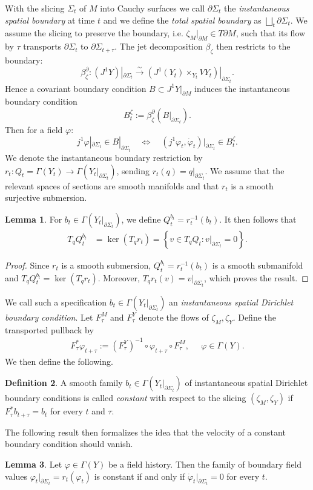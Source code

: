 \documentclass{article}
\theoremstyle{definition}
\newtheorem{definition}{Definition}[section]
\newtheorem{lemma}[definition]{Lemma}
\begin{document}
With the slicing $\Sigma_t$ of $M$ into Cauchy surfaces we call $\partial\Sigma_t$ the \textit{instantaneous spatial boundary} at time $t$ and we define the \textit{total spatial boundary} as $\bigsqcup_t \partial\Sigma_t$. We assume the slicing to preserve the boundary, i.e. $\zeta_M|_{\partial M}\in T\partial M$, such that its flow by $\tau$ transports $\partial\Sigma_t$ to $\partial\Sigma_{t+\tau}$. The jet decomposition $\beta_\zeta$ then restricts to the boundary:
\[
\beta_{\zeta}^\partial:
(J^1Y)|_{\partial\Sigma_t}
\overset{\sim}{\longrightarrow}
\left(J^1(Y_t)\times_{Y_t}VY_t\right)|_{\partial\Sigma_t}.
\]
Hence a covariant boundary condition \(B\subset J^1Y|_{\partial M}\)
induces the instantaneous boundary condition
\[
B_t^\zeta:=\beta_{\zeta}^\partial(B|_{\partial\Sigma_t}).
\]
Then for a field \(\varphi\):
\[
j^1\varphi|_{\partial\Sigma_t}\in B|_{\partial\Sigma_t}
\quad\Longleftrightarrow\quad
(j^1\varphi_t,\dot\varphi_t)|_{\partial\Sigma_t}\in B_t^\zeta.
\]
We denote the instantaneous boundary restriction by $r_t\colon Q_t=\Gamma(Y_t)\to \Gamma(Y_t|_{\partial\Sigma_t})$, sending $r_t(q)=q|_{\partial\Sigma_t}$. We assume that the relevant spaces of sections are smooth manifolds and that $r_t$ is a smooth surjective submersion.
\begin{lemma}\label{kernellemma}
For $b_t\in \Gamma(Y_t|_{\partial\Sigma_t})$, we define $Q_t^{b_t}=r_t^{-1}(b_t)$. It then follows that
\begin{align*}
    T_qQ_t^{b_t}
    &= \ker(T_qr_t) = \left\{v\in T_qQ_t :
    v|_{\partial\Sigma_t}=0\right\}.
\end{align*}
\end{lemma}
\begin{proof}
    Since $r_t$ is a smooth submersion, $Q_t^{b_t}=r_t^{-1}(b_t)$
is a smooth submanifold and $T_qQ_t^{b_t}=\ker(T_qr_t)$.
Moreover, $T_qr_t(v)=v|_{\partial\Sigma_t}$, which proves the
result.
\end{proof}
We call such a specification $b_t\in \Gamma(Y_t|_{\partial\Sigma_t})$ an \textit{instantaneous spatial Dirichlet boundary condition}. Let $F_\tau^M$ and $F_\tau^Y$ denote the flows of $\zeta_M,\zeta_Y$. Define the transported pullback by 
\begin{align*}
    F_\tau^*\varphi_{t+\tau}
    :=
    (F_\tau^Y)^{-1}
    \circ \varphi_{t+\tau}
    \circ F_\tau^M,\;\;\;\;\; \varphi\in \Gamma(Y).
\end{align*}
We then define the following.
\begin{definition}
A smooth family $b_t\in \Gamma(Y_t|_{\partial\Sigma_t})$ of instantaneous spatial Dirichlet boundary conditions is called \textit{constant} with
respect to the slicing $(\zeta_M,\zeta_Y)$ if $F_\tau^*b_{t+\tau}=b_t$
for every $t$ and $\tau$.
\end{definition}
The following result then formalizes the idea that the velocity of a constant boundary condition should vanish.
\begin{lemma}\label{stupidlemma}
    Let $\varphi\in \Gamma(Y)$ be a field history. Then the family of boundary field values $\varphi_t|_{\partial\Sigma_t}=r_t(\varphi_t)$ is constant if and only if $\dot{\varphi}_t|_{\partial\Sigma_t}=0$ for every $t$.
\end{lemma}
\end{document}
